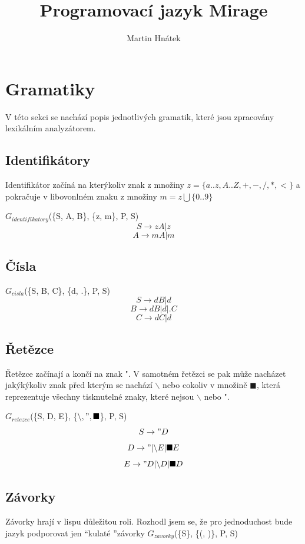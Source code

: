 \documentclass[a4paper,11pt]{article}
\author{Martin Hnátek}
\title{Programovací jazyk Mirage}
\date{}
\begin{document}
\maketitle

\newpage
\tableofcontents

\newpage
\section{Gramatiky}
V této sekci se nachází popis jednotlivých gramatik, které jsou zpracovány lexikálním analyzátorem.

\subsection{Identifikátory}
Identifikátor začíná na kterýkoliv znak z množiny $z = \{a..z, A..Z, +, -, /, *, <\}$
a pokračuje v libovonlném znaku z množiny $m = z \bigcup \{0..9\}$ 
\linebreak

$G_{identifikatory}$(\{S, A, B\}, \{z, m\}, P, S)
$$S \rightarrow zA | z$$
$$A \rightarrow mA | m$$

\subsection{Čísla}
$G_{cisla}$(\{S, B, C\}, \{d, .\}, P, S)
$$S \rightarrow dB | d$$
$$B \rightarrow dB | d | .C$$
$$C \rightarrow dC | d$$

\subsection{Řetězce}
Řetězce začínají a končí na znak ". V samotném řetězci se pak může nacházet jakýkýkoliv znak před kterým se nachází $\backslash$ nebo cokoliv v množině $\blacksquare$, která reprezentuje všechny tisknutelné znaky, které nejsou $\backslash$ nebo ".

$G_{retezce}$(\{S, D, E\}, \{$\backslash, ", \blacksquare$\}, P, S)
$$S \rightarrow "D$$
$$D \rightarrow " | \backslash E | \blacksquare E$$
$$E \rightarrow "D | \backslash D | \blacksquare D$$

\subsection{Závorky}
Závorky hrají v lispu důležitou roli. Rozhodl jsem se, že pro jednoduchost bude jazyk podporovat jen \textquotedblleft kulaté \textquotedblright závorky
$G_{zavorky}$(\{S\}, \{(, )\}, P, S)
\end{document}

